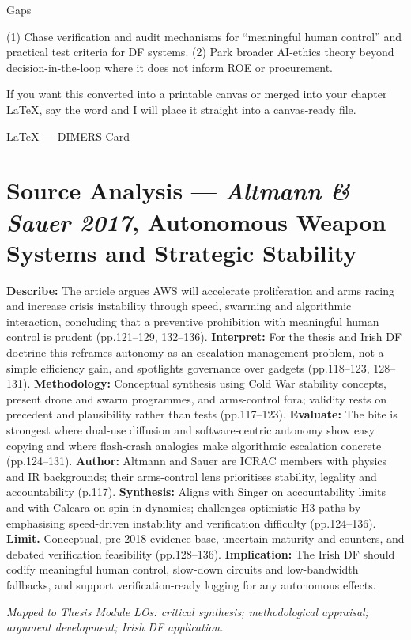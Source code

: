 Gaps

(1) Chase verification and audit mechanisms for “meaningful human control” and practical test criteria for DF systems.
(2) Park broader AI-ethics theory beyond decision-in-the-loop where it does not inform ROE or procurement.

If you want this converted into a printable canvas or merged into your chapter LaTeX, say the word and I will place it straight into a canvas-ready file.

\parencite{ALTMANN_2017}

LaTeX — DIMERS Card

\section*{Source Analysis — \textit{Altmann & Sauer 2017}, Autonomous Weapon Systems and Strategic Stability}
\textbf{Describe:} The article argues AWS will accelerate proliferation and arms racing and increase crisis instability through speed, swarming and algorithmic interaction, concluding that a preventive prohibition with meaningful human control is prudent (pp.121–129, 132–136).
\textbf{Interpret:} For the thesis and Irish DF doctrine this reframes autonomy as an escalation management problem, not a simple efficiency gain, and spotlights governance over gadgets (pp.118–123, 128–131).
\textbf{Methodology:} Conceptual synthesis using Cold War stability concepts, present drone and swarm programmes, and arms-control fora; validity rests on precedent and plausibility rather than tests (pp.117–123).
\textbf{Evaluate:} The bite is strongest where dual-use diffusion and software-centric autonomy show easy copying and where flash-crash analogies make algorithmic escalation concrete (pp.124–131).
\textbf{Author:} Altmann and Sauer are ICRAC members with physics and IR backgrounds; their arms-control lens prioritises stability, legality and accountability (p.117).
\textbf{Synthesis:} Aligns with Singer on accountability limits and with Calcara on spin-in dynamics; challenges optimistic H3 paths by emphasising speed-driven instability and verification difficulty (pp.124–136).
\textbf{Limit.} Conceptual, pre-2018 evidence base, uncertain maturity and counters, and debated verification feasibility (pp.128–136). \textbf{Implication:} The Irish DF should codify meaningful human control, slow-down circuits and low-bandwidth fallbacks, and support verification-ready logging for any autonomous effects.

\textit{Mapped to Thesis Module LOs: critical synthesis; methodological appraisal; argument development; Irish DF application.}


